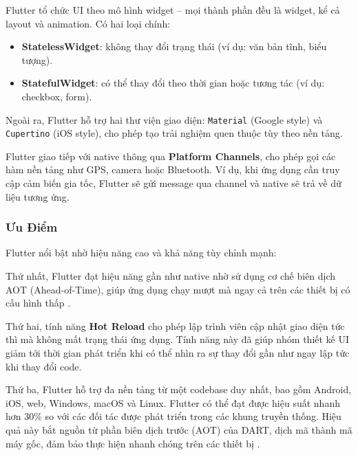 \vspace{0.5em}

Flutter tổ chức UI theo mô hình widget – mọi thành phần đều là widget, kể cả layout và animation.  
Có hai loại chính:
\begin{itemize}
    \item \textbf{StatelessWidget}: không thay đổi trạng thái (ví dụ: văn bản tĩnh, biểu tượng).
    \item \textbf{StatefulWidget}: có thể thay đổi theo thời gian hoặc tương tác (ví dụ: checkbox, form).
\end{itemize}

Ngoài ra, Flutter hỗ trợ hai thư viện giao diện: \texttt{Material} (Google style) và \texttt{Cupertino} (iOS style), cho phép tạo trải nghiệm quen thuộc tùy theo nền tảng.

\vspace{0.5em}

Flutter giao tiếp với native thông qua \textbf{Platform Channels}, cho phép gọi các hàm nền tảng như GPS, camera hoặc Bluetooth.  
Ví dụ, khi ứng dụng cần truy cập cảm biến gia tốc, Flutter sẽ gửi message qua channel và native sẽ trả về dữ liệu tương ứng.

\subsubsection{Ưu Điểm}

Flutter nổi bật nhờ hiệu năng cao và khả năng tùy chỉnh mạnh:

\vspace{0.5em}

Thứ nhất, Flutter đạt hiệu năng gần như native nhờ sử dụng cơ chế biên dịch AOT (Ahead-of-Time), giúp ứng dụng chạy mượt mà ngay cả trên các thiết bị có cấu hình thấp .

Thứ hai, tính năng \textbf{Hot Reload} cho phép lập trình viên cập nhật giao diện tức thì mà không mất trạng thái ứng dụng.  
Tính năng này đã giúp nhóm thiết kế UI giảm tới thời gian phát triển khi có thể nhìn ra sự thay đổi gần như ngay lập tức khi thay đổi code.

\vspace{0.5em}

Thứ ba, Flutter hỗ trợ đa nền tảng từ một codebase duy nhất, bao gồm Android, iOS, web, Windows, macOS và Linux. Flutter có thể đạt được hiệu suất nhanh hơn 30\% so với các đối tác được phát triển trong các khung truyền thống. Hiệu quả này bắt nguồn từ phần biên dịch trước (AOT) của DART, dịch mã thành mã máy gốc, đảm bảo thực hiện nhanh chóng trên các thiết bị \cite{moldstud2025}.

